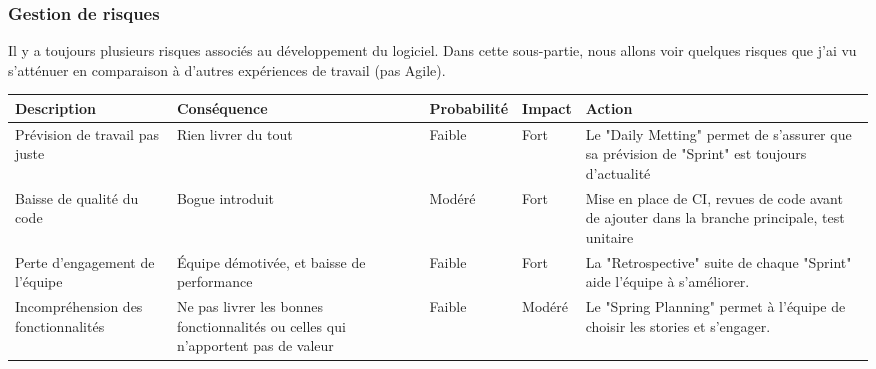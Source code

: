 \subsubsection{Gestion de risques}
Il y a toujours plusieurs risques associés au développement du logiciel. Dans cette sous-partie, nous allons voir quelques risques que j'ai vu s'atténuer en comparaison à d'autres expériences de travail (pas Agile). \cite{basile_plessis_2014}
\begin{center}
\begin{tabular}{p{3cm}|p{3cm}|l|l|p{5cm}}
Description & Conséquence & Probabilité & Impact & Action \\ \hline
Prévision de travail pas juste & Rien livrer du tout & Faible & Fort & Le "Daily Metting" permet de s'assurer que sa prévision de "Sprint" est toujours d'actualité \\
Baisse de qualité du code & Bogue introduit & Modéré & Fort & Mise en place de CI, revues de code avant de ajouter dans la branche principale, test unitaire \\
Perte d'engagement de l'équipe & Équipe démotivée, et baisse de performance & Faible & Fort & La "Retrospective" suite de chaque "Sprint" aide l'équipe à s'améliorer. \\
Incompréhension des fonctionnalités & Ne pas livrer les bonnes fonctionnalités ou celles qui n'apportent pas de valeur & Faible & Modéré & Le "Spring Planning" permet à l'équipe de choisir les stories et s'engager. \\


\end{tabular}
\end{center}
